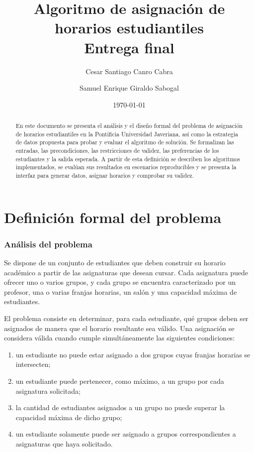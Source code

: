 \documentclass[11pt]{article}
\title{Algoritmo de asignación de horarios estudiantiles\\
\large Entrega final}
\author{Cesar Santiago Canro Cabra \and Samuel Enrique Giraldo Sabogal}
\date{\today}
\numberwithin{equation}{section}
\numberwithin{figure}{section}
\numberwithin{table}{section}
\theoremstyle{definition}
\begin{document}

\maketitle

\begin{abstract}
En este documento se presenta el análisis y el diseño formal del problema de
asignación de horarios estudiantiles en la Pontificia Universidad Javeriana,
así como la estrategia de datos propuesta para probar y evaluar el algoritmo
de solución. Se formalizan las entradas, las precondiciones, las restricciones
de validez, las preferencias de los estudiantes y la salida esperada.
A partir de esta definición se describen los algoritmos implementados,
se evalúan sus resultados en escenarios reproducibles y se presenta
la interfaz para generar datos, asignar horarios y comprobar su validez.
\end{abstract}

\tableofcontents
\newpage

\part{Definición formal del problema}

\section{Análisis del problema}

Se dispone de un conjunto de estudiantes que deben construir su horario
académico a partir de las asignaturas que desean cursar. Cada asignatura puede
ofrecer uno o varios grupos, y cada grupo se encuentra caracterizado por un
profesor, una o varias franjas horarias, un salón y una capacidad máxima de
estudiantes.

El problema consiste en determinar, para cada estudiante, qué grupos deben ser
asignados de manera que el horario resultante sea válido. Una asignación se
considera válida cuando cumple simultáneamente las siguientes condiciones:

\begin{enumerate}
  \item un estudiante no puede estar asignado a dos grupos cuyas franjas
        horarias se intersecten;
  \item un estudiante puede pertenecer, como máximo, a un grupo por cada
        asignatura solicitada;
  \item la cantidad de estudiantes asignados a un grupo no puede superar la
        capacidad máxima de dicho grupo;
  \item un estudiante solamente puede ser asignado a grupos correspondientes
        a asignaturas que haya solicitado.
\end{enumerate}
\end{document}
